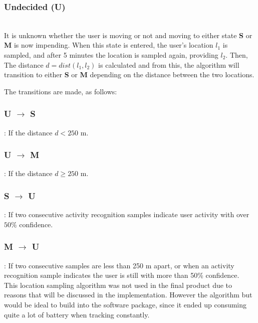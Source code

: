 \subsubsection*{Undecided (U)}\\
It is unknown whether the user is moving or not and moving to either state \textbf{S} or \textbf{M} is now impending. When this state is entered, the user's location $l_1$ is sampled, and after 5 minutes the location is sampled again, providing $l_2$. Then,  The distance $d = dist(l_1, l_2)$ is calculated and from this, the algorithm will transition to either \textbf{S} or \textbf{M} depending on the distance between the two locations.

The transitions are made, as follows:

\subsubsection*{U $\rightarrow$ S}: If the distance $d < 250$ m.\\

\subsubsection*{U $\rightarrow$ M}: If the distance $d \geq 250$ m.\\

\subsubsection*{S $\rightarrow$ U}: If two consecutive activity recognition samples indicate user activity with over $50\%$ confidence.\\

\subsubsection*{M $\rightarrow$  U}: If two consecutive samples are less than 250 m apart, or when an activity recognition sample indicates the user is still with more than 50\% confidence.\\

This location sampling algorithm was not used in the final product due to reasons that will be discussed in the implementation. However the algorithm  but would be ideal to build into the software package, since it ended up consuming quite a lot of battery when tracking constantly.
